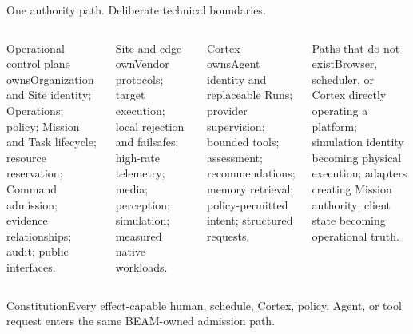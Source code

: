 \documentclass[aspectratio=169,10pt]{beamer}
\begin{document}
\begin{frame}{One authority path. Deliberate technical boundaries.}
\begin{columns}[T]
\begin{block}{Operational control plane owns}\small Organization and Site identity; Operations; policy; Mission and Task lifecycle; resource reservation; Command admission; evidence relationships; audit; public interfaces.\end{block}
\begin{block}{Site and edge own}\small Vendor protocols; target execution; local rejection and failsafes; high-rate telemetry; media; perception; simulation; measured native workloads.\end{block}
\begin{block}{Cortex owns}\small Agent identity and replaceable Runs; provider supervision; bounded tools; assessment; recommendations; memory retrieval; policy-permitted intent; structured requests.\end{block}
\begin{block}{Paths that do not exist}\small Browser, scheduler, or Cortex directly operating a platform; simulation identity becoming physical execution; adapters creating Mission authority; client state becoming operational truth.\end{block}
\end{columns}
\vspace{2mm}
\begin{block}{Constitution}\centering Every effect-capable human, schedule, Cortex, policy, Agent, or tool request enters the same BEAM-owned admission path.\end{block}
\end{frame}
\end{document}
